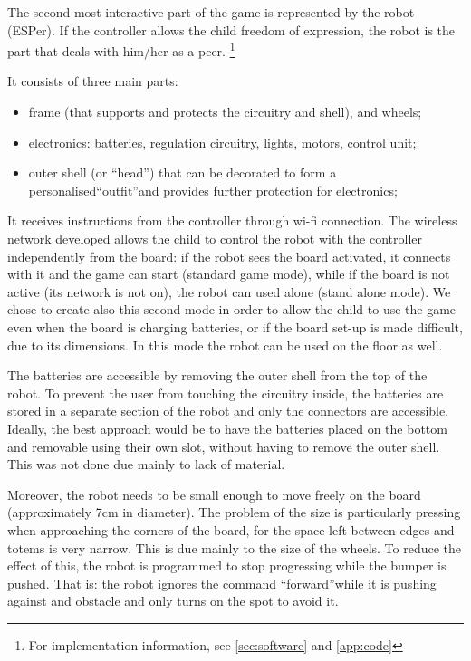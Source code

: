 \documentclass[a4paper,twoside]{book}
\begin{document}
The second most interactive part of the game is represented by the robot (ESPer). If the controller allows the child freedom of expression, the robot is the part that deals with him/her as a peer. 
\footnote{For implementation information, see \autoref{sec:software} and \autoref{app:code} }

\beforelist It consists of three main parts:
\begin{itemize}
\item frame (that supports and protects the circuitry and shell), and wheels;
\item electronics: batteries, regulation circuitry, lights, motors, control unit;
\item outer shell (or \textquotedblleft head\textquotedblright ) that can be decorated to form a personalised\textquotedblleft outfit\textquotedblright  and provides further protection for electronics;
\end{itemize}
\afterlist*
It receives instructions from the controller through wi-fi connection. The wireless network developed allows the child to control the robot with the controller independently from the board: if the robot sees the board activated, it connects with it and the game can start (standard game mode), while if the board is not active (its network is not on), the robot can used alone (stand alone mode). We chose to create also this second mode in order to allow the child to use the game even when the board is charging batteries, or if the board set-up is made difficult, due to its dimensions. In this mode the robot can be used on the floor as well.

The batteries are accessible by removing the outer shell from the top of the robot. To prevent the user from touching the circuitry inside, the batteries are stored in a separate section of the robot and only the connectors are accessible.
Ideally, the best approach would be to have the batteries placed on the bottom and removable using their own slot, without having to remove the outer shell. This was not done due mainly to lack of material.

Moreover, the robot needs to be small enough to move freely on the board (approximately 7cm in diameter). The problem of the size is particularly pressing when approaching the corners of the board, for the space left between edges and totems is very narrow. This is due mainly to the size of the wheels. To reduce the effect of this, the robot is programmed to stop progressing while the bumper is pushed. That is: the robot ignores the command \textquotedblleft forward\textquotedblright  while it is pushing against and obstacle and only turns on the spot to avoid it.
\end{document}
